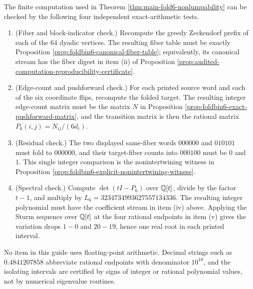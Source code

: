 \begin{proposition}\label{prop:referee-guide-exact-window6-audit}
The finite computation used in Theorem \ref{thm:main-fold6-nonlumpability} can be checked by the following four independent exact-arithmetic tests.
\begin{enumerate}[label=\textup{(\roman*)}]
\item \textup{(Fiber and block-indicator check.)}  Recompute the greedy Zeckendorf prefix of each of the \(64\) dyadic vertices.  The resulting fiber table must be exactly Proposition \ref{prop:foldbin6-canonical-fiber-table}; equivalently, its canonical stream has the fiber digest in item \textup{(ii)} of Proposition \ref{prop:audited-computation-reproducibility-certificate}.
\item \textup{(Edge-count and pushforward check.)}  For each printed source word and each of the six coordinate flips, recompute the folded target.  The resulting integer edge-count matrix must be the matrix \(N\) in Proposition \ref{prop:foldbin6-exact-pushforward-matrix}, and the transition matrix is then the rational matrix \(P_6(i,j)=N_{ij}/(6d_i)\).
\item \textup{(Residual check.)}  The two displayed same-fiber words \(000000\) and \(010101\) must fold to \(000000\), and their target-fiber counts into \(000100\) must be \(0\) and \(1\).  This single integer comparison is the nonintertwining witness in Proposition \ref{prop:foldbin6-explicit-nonintertwining-witness}.
\item \textup{(Spectral check.)}  Compute \(\det(tI-P_6)\) over \(\mathbb{Q}[t]\), divide by the factor \(t-1\), and multiply by \(L_6=3234734993627557134336\).  The resulting integer polynomial must have the coefficient stream in item \textup{(iv)} above.  Applying the Sturm sequence over \(\mathbb{Q}[t]\) at the four rational endpoints in item \textup{(v)} gives the variation drops \(1-0\) and \(20-19\), hence one real root in each printed interval.
\end{enumerate}
No item in this guide uses floating-point arithmetic.  Decimal strings such as \(0.4841207858\) abbreviate rational endpoints with denominator \(10^{10}\), and the isolating intervals are certified by signs of integer or rational polynomial values, not by numerical eigenvalue routines.
\end{proposition}

